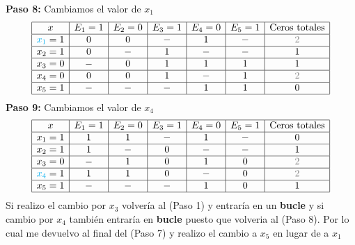 \begin{sol}
\textbf{Paso 8:} Cambiamos el valor de $x_1$\\
$$
\begin{array}{|c|c|c|c|c|c|c|c|}
\hline
x & E_1=1 & E_2=0 & E_3=1 & E_4=0 & E_5=1 & \text{Ceros totales}\\
\hline
\textcolor{cyan}{x_1}= 1& 0 & 0& - & 1& - &\textcolor{gray}{2}\\
\hline
x_2=1& 0&-& 1&- &-&1\\
\hline
x_3=0&-&0&1&1&1&1\\
\hline
x_4=0& 0&0&1&-&1&\textcolor{gray}{2}\\
\hline
x_5=1&-&-&-&1&1&0\\
\hline
\end{array}
$$
\textbf{Paso 9:} Cambiamos el valor de $x_4$\\

$$
\begin{array}{|c|c|c|c|c|c|c|c|}
\hline
x & E_1=1 & E_2=0 & E_3=1 & E_4=0 & E_5=1 & \text{Ceros totales}\\
\hline
x_1= 1& 1 & 1& - & 1& - &0\\
\hline
x_2=1& 1&-& 0&- &-&1\\
\hline
x_3=0&-&1&0&1&0&\textcolor{gray}{2}\\
\hline
\textcolor{cyan}{x_4}=1& 1&1&0&-&0&\textcolor{gray}{2}\\
\hline
x_5=1&-&-&-&1&0&1\\
\hline
\end{array}
$$
Si realizo el cambio por $x_3$ volvería al (Paso 1) y entraría en un \textbf{bucle} y si cambio por $x_4$ también entraría en \textbf{bucle} puesto que volveria al (Paso 8). Por lo cual me devuelvo al final del (Paso 7) y realizo el cambio a $x_5$ en lugar de a $x_1$\\



\end{sol}
